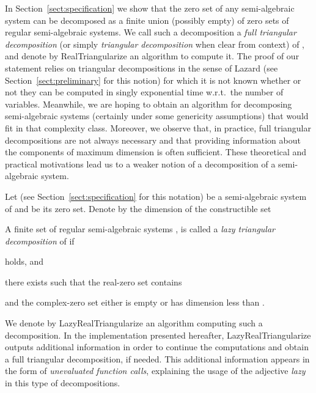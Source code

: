\documentclass{sig-alternate}
\begin{document}
\smallskip{}
In Section~\ref{sect:specification} we show
that the zero set of any semi-algebraic system  can be decomposed 
as a finite union (possibly empty) 
of zero sets of regular semi-algebraic systems.
We call such a decomposition a {\em full triangular decomposition} 
(or simply {\em triangular decomposition} when clear from context)
of  , 
and denote by {\sf RealTriangularize} an algorithm to compute it.
The proof of our statement relies on triangular decompositions
in the sense of Lazard 
(see Section~\ref{sect:preliminary} for this notion)
for which it is not known whether or not they  
can be computed in singly exponential time w.r.t.\ the number of variables.
Meanwhile, we are hoping to obtain an algorithm
for decomposing semi-algebraic systems 
(certainly under some genericity assumptions)
that would fit in that complexity class.
Moreover, we observe that, in practice, 
full triangular decompositions
are not always necessary and that 
providing information about the components of maximum
dimension is often sufficient.
These theoretical and practical motivations 
lead us to a 
weaker notion of a decomposition
of a semi-algebraic system.

\newcommand{\BB}{\mbox{}}

\smallskip{}
Let  (see Section~\ref{sect:specification}
for this notation) be a semi-algebraic system
of   and 
be  its zero set.
Denote by  the dimension of the constructible  set
 
A finite set of regular semi-algebraic systems , 
is called a \emph{lazy triangular decomposition} of  if
\begin{itemizeshort}
\item   holds, and
\item there exists  such that 
     the real-zero set 
     contains 

    and the complex-zero set 
    either is empty or
   has dimension less than .
\end{itemizeshort}
We denote by {\sf LazyRealTriangularize} an algorithm 
computing such a decomposition. 
In the implementation presented hereafter,
{\sf LazyRealTriangularize} 
outputs additional information in order to 
continue the computations and obtain
a full triangular decomposition, if needed.
This additional information appears in the form
of {\em unevaluated function calls}, explaining
the usage of the adjective {\em lazy}
in this type of decompositions.
\end{document}

